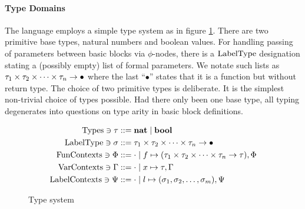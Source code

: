 \documentclass[a4paper, oneside, 10pt, draft]{memoir}
\begin{document}
\paragraph{Type Domains} The language employs a simple type system as in
figure \ref{fig:type-system}. There are two primitive base types,
natural numbers and boolean values. For handling passing of parameters
between basic blocks via $\phi$-nodes, there is a $\mathrm{Label Type}$
designation stating a (possibly empty) list of formal parameters. We
notate such lists as $\tau_1 \times \tau_2 \times \dotsb \times \tau_n -> \bullet$ where the last
``$\bullet$'' states that it is a function but without return type.
The choice of two primitive types is deliberate. It is the simplest
non-trivial choice of types possible. Had there only been one base
type, all typing degenerates into questions on type arity in basic
block definitions.

\begin{figure}
  \begin{align*}
    \mathrm{Types} \ni \tau & ::= \mathbf{nat} \; \vert \; \mathbf{bool} \\
    \mathrm{Label Type} \ni \sigma   & ::= \tau_1 \times \tau_2 \times \dotsb \times \tau_n -> \bullet\\
    \mathrm{Fun Contexts} \ni \Phi & ::= \cdot \; \vert \; f \mapsto (\tau_1 \times \tau_2 \times \dotsb \times \tau_n -> \tau), \Phi \\
    \mathrm{Var Contexts} \ni \Gamma & ::= \cdot \; \vert \; x \mapsto \tau,\Gamma\\
    \mathrm{Label Contexts} \ni \Psi   & ::= \cdot \; \vert \; l \mapsto (\sigma_1, \sigma_2, \dotsc, \sigma_m),\Psi
  \end{align*}
  \caption{Type system}
  \label{fig:type-system}
\end{figure}

\newcommand{\tpr}{|-_{\mathrm{r}}}
\newcommand{\tpc}{|-_{\mathrm{c}}}
\newcommand{\tpop}{|-_{\mathrm{o}}}
\newcommand{\tpb}{|-_{\mathrm{b}}}
\end{document}
